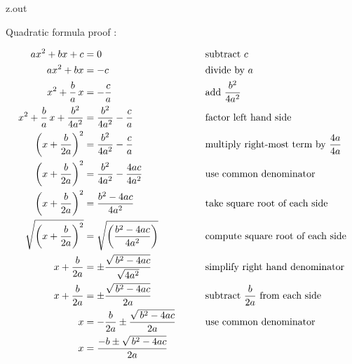 \begin{VerbatimOut}{z.out}

Quadratic formula proof
\cite{khan2018}:

{
  \addtolength{\jot}{6pt}
  \begin{alignat}{2}
    ax^2 + bx + c
      &= 0
      &
      &\text{subtract $c$}\\
    ax^2 + bx
      &= -c
      &
      &\text{divide by $a$}\notag\\
    x^2 + \frac ba\,x
      &= -\frac ca
      &
      &\text{add $\displaystyle\frac{b^2}{4a^2}$}\notag\\
    x^2+\frac ba\,x+\frac{b^2}{4a^2}
      &= \frac{b^2}{4a^2}-\frac ca
      &
      &\text{factor left hand side}\notag\\
    \left(x+\frac b{2a}\right)^2
      &= \frac{b^2}{4a^2}-\frac ca
      &
      &\text{multiply right-most term by $\displaystyle\frac{4a}{4a}$}\notag\\
    \left(x + \frac b{2a}\right)^2
      &= \frac{b^2}{4a^2}-\frac{4ac}{4a^2}
      &
      &\text{use common denominator}\notag\\
    \left(x + \frac b{2a}\right)^2
      &= \frac{b^2-4ac}{4a^2}
      &
      &\text{take square root of each side}\notag\\
    \sqrt{\left(x + \frac b{2a}\right)^2}
      &= \sqrt{\left(\frac{b^2-4ac}{4a^2}\right)}
      &
      &\text{compute square root of each side}\notag\\
    x + \frac b{2a}
      &= \pm \frac{\sqrt{\,b^2-4ac}}{\sqrt{4a^2}}
      &
      &\text{simplify right hand denominator}\notag\\
    x + \frac b{2a}
      &= \pm \frac{\sqrt{\,b^2-4ac}}{2a}
      &
      &\text{subtract $\displaystyle\frac b{2a}$ from each side}\notag\\
    x
      &= -\frac b{2a} \pm \frac{\sqrt{\,b^2-4ac}}{2a}
      &\qquad
      &\text{use common denominator}\notag\\
    x
      &= \frac{-b \pm \sqrt{\,b^2-4ac}}{2a}
  \end{alignat}
}
\end{VerbatimOut}

\MyIO


